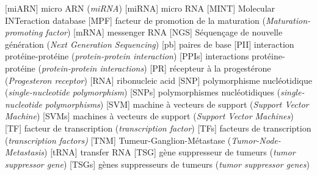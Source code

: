 \begin{acronym}[CDKN2A]
						[miARN]		{micro \acs{ARN} (\emph{\ac{miRNA}})}
						[miRNA]		{micro \acs{RNA}}
						[MINT]		{Molecular INTeraction database}
						[MPF]		{facteur de promotion de la maturation (\emph{Maturation-promoting factor})}
						[mRNA]		{messenger \ac{RNA}}
						[NGS]		{Séquençage de nouvelle génération (\emph{Next Generation Sequencing})}
						[pb]		{paires de base}
						[PII]		{interaction protéine-protéine (\emph{protein-protein interaction})}
					{interactions protéine-protéine (\emph{protein-protein interactions})}
						[PR]		{récepteur à la progestérone (\emph{Progesteron receptor})}
						[RNA]		{ribonucleic acid}
						[SNP]		{polymorphisme nucléotidique (\emph{single-nucleotide polymorphism})}
					{polymorphismes nucléotidiques (\emph{single-nucleotide polymorphisms})}
						[SVM]		{machine à vecteurs de support (\emph{Support Vector Machine})}
					{machines à vecteurs de support (\emph{Support Vector Machines})}
						[TF]		{facteur de transcription (\emph{transcription factor})}
					{facteurs de transcription (\emph{transcription factors)}}
						[TNM]		{Tumeur-Ganglion-Métastase (\emph{Tumor-Node-Metastasis})}
						[tRNA]		{transfer \ac{RNA}}
						[TSG]		{gène suppresseur de tumeurs (\emph{tumor suppressor gene})}
					{gènes suppresseurs de tumeurs (\emph{tumor suppressor genes})}
		\end{acronym}
